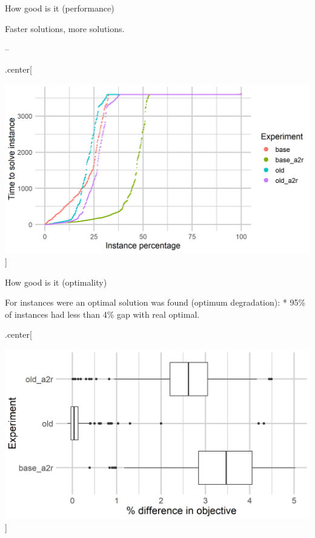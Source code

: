 \begin{frame}

\begin{block}{How good is it (performance)}

Faster solutions, more solutions.

--

.center{[}

\includegraphics[width=0.8\linewidth]{time_performance_ordered_2tasks}
{]}

\end{block}

\end{frame}

\begin{frame}

\begin{block}{How good is it (optimality)}

For instances were an optimal solution was found (optimum degradation):
* 95\% of instances had less than 4\% gap with real optimal.

.center{[}

\includegraphics[width=0.8\linewidth]{quality_degradation_2tasks} {]}

\end{block}

\end{frame}

